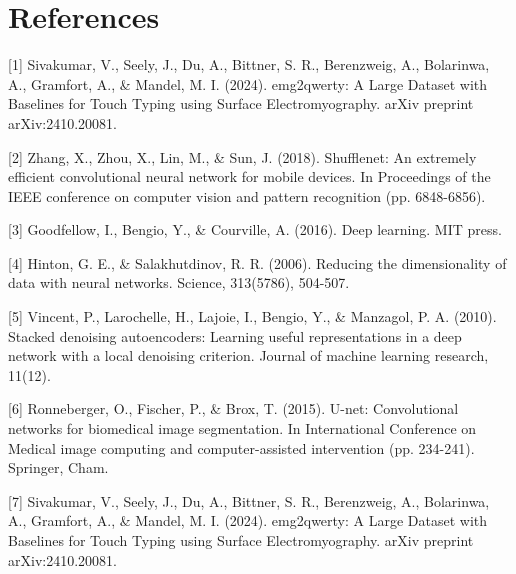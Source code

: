 \section*{References}

{
\small

[1] Sivakumar, V., Seely, J., Du, A., Bittner, S. R., Berenzweig, A., Bolarinwa, A., Gramfort, A., \& Mandel, M. I. (2024). emg2qwerty: A Large Dataset with Baselines for Touch Typing using Surface Electromyography. arXiv preprint arXiv:2410.20081.

[2] Zhang, X., Zhou, X., Lin, M., \& Sun, J. (2018). Shufflenet: An extremely efficient convolutional neural network for mobile devices. In Proceedings of the IEEE conference on computer vision and pattern recognition (pp. 6848-6856).

    [3] Goodfellow, I., Bengio, Y., \& Courville, A. (2016). Deep learning. MIT press.

    [4] Hinton, G. E., \& Salakhutdinov, R. R. (2006). Reducing the dimensionality of data with neural networks. Science, 313(5786), 504-507.

[5] Vincent, P., Larochelle, H., Lajoie, I., Bengio, Y., \& Manzagol, P. A. (2010). Stacked denoising autoencoders: Learning useful representations in a deep network with a local denoising criterion. Journal of machine learning research, 11(12).

    [6] Ronneberger, O., Fischer, P., \& Brox, T. (2015). U-net: Convolutional networks for biomedical image segmentation. In International Conference on Medical image computing and computer-assisted intervention (pp. 234-241). Springer, Cham.

    [7] Sivakumar, V., Seely, J., Du, A., Bittner, S. R., Berenzweig, A., Bolarinwa, A., Gramfort, A., \& Mandel, M. I. (2024). emg2qwerty: A Large Dataset with Baselines for Touch Typing using Surface Electromyography. arXiv preprint arXiv:2410.20081.

}
